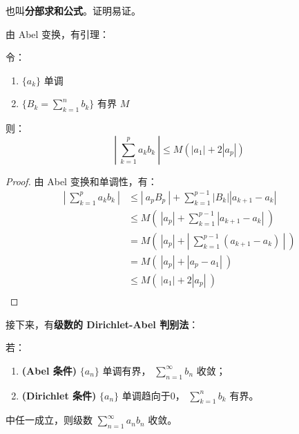 也叫\textbf{分部求和公式}。证明易证。

由 Abel 变换，有引理：

\begin{lemma}[Abel 引理]\label{lem:abel-lemma}
  令：
  \begin{enumerate}
    \item $\{a_k\}$ 单调
    \item $\{B_k = \sum_{k=1}^n b_k\}$ 有界 $M$
  \end{enumerate}
  则：
  \begin{equation*}
    \left|\ \sum_{k=1}^p a_k b_k\ \right| \leq M (|a_1| + 2|a_p|)
  \end{equation*}
\end{lemma}

\begin{proof}
  由 Abel 变换和单调性，有：
  \begin{align*}
    \left|\ \sum_{k=1}^p a_k b_k \ \right|
    &\leq |\ a_p B_p \ | + \sum_{k=1}^{p-1} |B_k| |a_{k+1} - a_k| \\
    &\leq M \left(\ |a_p| + \sum_{k=1}^{p-1} |a_{k+1} - a_k| \ \right) \\
    &= M \left(\ |a_p| + \left|\ \sum_{k=1}^{p-1} (a_{k+1} - a_k) \ \right| \ \right) \\
    &= M \left(\ |a_p| + |a_p - a_1|\ \right) \\
    &\leq M \left(\ |a_1| + 2|a_p|\ \right) \\
  \end{align*}
\end{proof}

接下来，有\textbf{级数的 Dirichlet-Abel 判别法}：

\begin{theorem}\label{thm:dirichlet-abel-test}
  若：
  \begin{enumerate}
    \item \textbf{(Abel 条件)} $\{a_n\}$ 单调有界， $\sum_{n=1}^{\infty} b_n$ 收敛；
    \item \textbf{(Dirichlet 条件)} $\{a_n\}$ 单调趋向于0， $\sum_{k=1}^{n} b_k$ 有界。
  \end{enumerate}
  中任一成立，则级数 $\sum_{n=1}^{\infty} a_n b_n$ 收敛。
\end{theorem}

